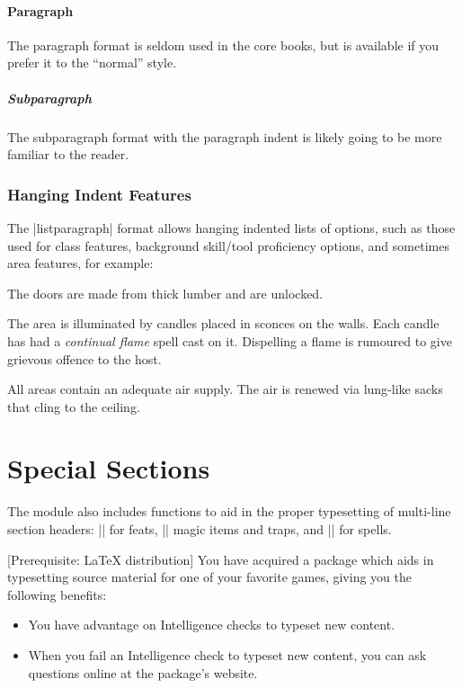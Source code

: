 \documentclass[letterpaper,twocolumn,openany,fancy,nodeprecatedcode]{dndbook}
\begin{document}
\paragraph{Paragraph}
The paragraph format is seldom used in the core books, but is available if you prefer it to the ``normal'' style.

\subparagraph{Subparagraph}
The subparagraph format with the paragraph indent is likely going to be more familiar to the reader.

\subsubsection{Hanging Indent Features}
The |listparagraph| format allows hanging indented
lists of options, such as those used for class features,
background skill/tool proficiency options, and
sometimes area features, for example:

{The doors are made from thick lumber and are unlocked.}

{The area is illuminated by candles placed in sconces on the
walls. Each candle has had a \textit{continual flame} spell
cast on it. Dispelling a flame is rumoured to give grievous offence
to the host.}

{All areas contain an adequate air supply. The air is renewed
via lung-like sacks that cling to the ceiling.}

\section{Special Sections}
The module also includes functions to aid in the proper typesetting of multi-line section headers: |\DndFeatHeader| for feats, |\DndItemHeader| magic items and traps, and |\DndSpellHeader| for spells.

[Prerequisite: \LaTeX{} distribution]
You have acquired a package which aids in typesetting source material for one of your favorite games, giving you the following benefits:

\begin{itemize}
  \item You have advantage on Intelligence checks to typeset new content.
  \item When you fail an Intelligence check to typeset new content, you can ask questions online at the package's website.
\end{itemize}
\end{document}

